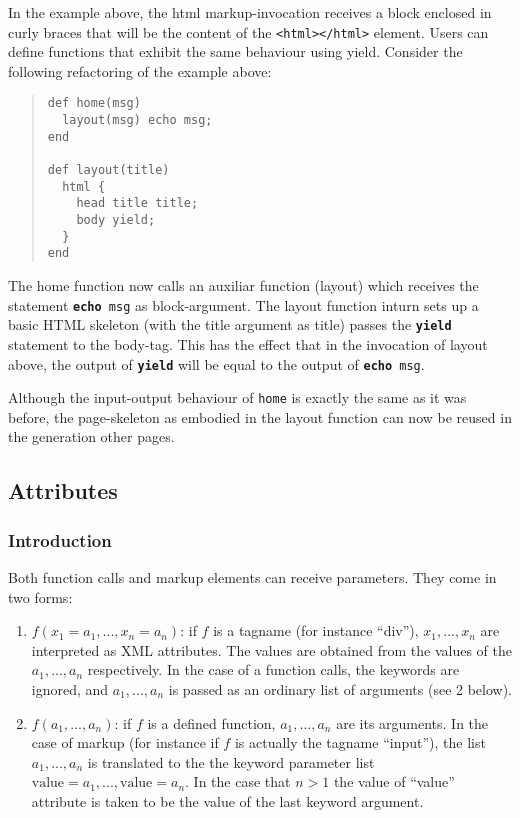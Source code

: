 \documentclass[a4paper]{article}
\begin{document}
In the example above, the html markup-invocation receives a block
enclosed in curly braces that will be the content of the
\verb!<html></html>! element. Users can define functions that exhibit
the same behaviour using yield. Consider the following refactoring of
the example above:
\begin{quote}
\begin{lstlisting}[language=waebric]
def home(msg)
  layout(msg) echo msg;
end

def layout(title)
  html {
    head title title;
    body yield;
  }
end
\end{lstlisting}
\end{quote}
The home function now calls an auxiliar function (layout) which
receives the statement \texttt{\textbf{echo} msg} as
block-argument. The layout function inturn sets up a basic HTML
skeleton (with the title argument as title) passes the
\texttt{\textbf{yield}} statement to the body-tag. This has the effect
that in the invocation of layout above, the output of
\texttt{\textbf{yield}} will be equal to the output of
\texttt{\textbf{echo} msg}.

Although the input-output behaviour of \texttt{home} is exactly the
same as it was before, the page-skeleton as embodied in the layout
function can now be reused in the generation other pages.


\subsection{Attributes}

\subsubsection{Introduction}

Both function calls and markup elements can receive parameters. They
come in two forms:
\begin{enumerate}
\item $f(x_1 = a_1,..., x_n = a_n)$: if $f$ is a tagname (for instance
  ``div''), $x_1,...,x_n$ are interpreted as XML attributes. The
  values are obtained from the values of the $a_1,...,a_n$
  respectively. In the case of a function calls, the keywords are
  ignored, and $a_1,...,a_n$ is passed as an ordinary list of
  arguments (see 2 below).
\item $f(a_1,..., a_n)$: if $f$ is a defined function, $a_1,...,a_n$ are its
  arguments. In the case of markup (for instance if $f$ is actually
  the tagname ``input''), the list $a_1,...,a_n$ is translated to the
  the keyword parameter list $\text{value} = a_1, ..., \text{value} =
  a_n$. In the case that $n > 1$ the value of ``value'' attribute is
  taken to be the value of the last keyword argument.
\end{enumerate}
\end{document}
